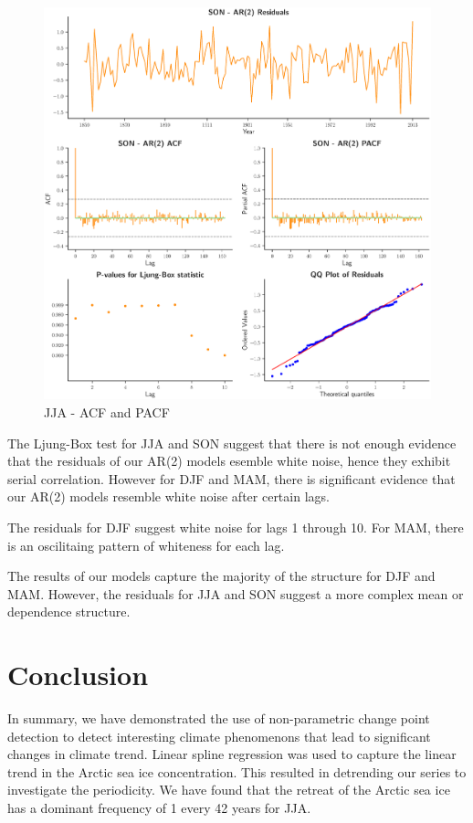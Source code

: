 \documentclass[12pt]{article}
\begin{document}
\begin{figure}[!htbp]
  \centering
  \includegraphics[width=1\textwidth,center]{figs/son_res}
  \caption{JJA - ACF and PACF}\label{son_res}
\end{figure}

The Ljung-Box test for JJA and SON suggest that there is not enough evidence that the residuals of our AR(2) models esemble white noise, hence they exhibit serial correlation. However for DJF and MAM, there is significant evidence that our AR(2) models resemble white noise after certain lags.

The residuals for DJF suggest white noise for lags 1 through 10. For MAM, there is an oscilitaing pattern of whiteness for each lag.

The results of our models capture the majority of the structure for DJF and MAM. However, the residuals for JJA and SON suggest a more complex mean or dependence structure.

\section{Conclusion}
In summary, we have demonstrated the use of non-parametric change point detection to detect interesting climate phenomenons that lead to significant changes in climate trend. Linear spline regression was used to capture the linear trend in the Arctic sea ice concentration. This resulted in detrending our series to investigate the periodicity. We have found that the retreat of the Arctic sea ice has a dominant frequency of 1 every 42 years for JJA.



\end{document}
